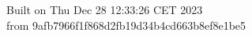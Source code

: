 {\noindent Built on Thu Dec 28 12:33:26 CET 2023} \\ 
 {\noindent from 9afb7966f1f868d2fb19d34b4cd663b8ef8e1be5}
